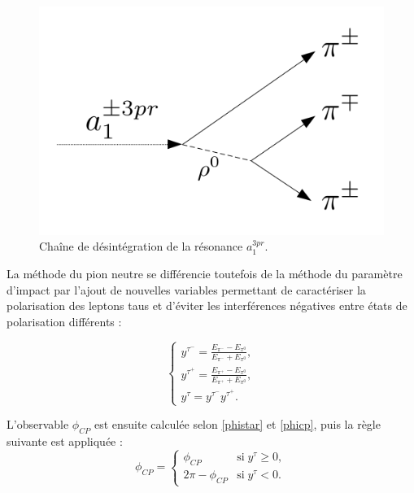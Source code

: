 \begin{figure}[!ht]
\centering
    \includegraphics[scale=0.5]{Chapitre6/Images/rhoDP.png} 
    \caption{Chaîne de désintégration de la résonance $a_1^{3pr}$.}
    \label{rho0plane}
\end{figure}

La méthode du pion neutre se différencie toutefois de la méthode du paramètre d'impact par l'ajout de nouvelles variables permettant de caractériser la polarisation des leptons taus et d'éviter les interférences négatives entre états de polarisation différents :

\begin{equation}
    \left\{
    \begin{array}{ll}
        y^{\tau^-}=\frac{E_{\pi^-}-E_{\pi^0}}{E_{\pi^-}+E_{\pi^0}}, \\
        y^{\tau^+}=\frac{E_{\pi^+}-E_{\pi^0}}{E_{\pi^+}+E_{\pi^0}}, \\
        y^{\tau}=y^{\tau^-}y^{\tau^+}.
    \end{array}
    \right.
\end{equation} 

L'observable $\phi_{CP}$ est ensuite calculée selon \ref{phistar} et \ref{phicp}, puis la règle suivante est appliquée : \\

\begin{equation}
\phi_{CP}=
    \left\{
    \begin{array}{ll}
        \phi_{CP} & \mbox{si} \; y^{\tau}\geq0, \\
        2\pi - \phi_{CP} & \mbox{si} \; y^{\tau}<0.
    \end{array}
    \right.
\end{equation}

